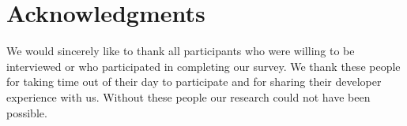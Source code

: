 \documentclass[conference]{IEEEtran}
\begin{document}
\section{Acknowledgments}

We would sincerely like to thank all participants who were willing to be interviewed or who participated
in completing our survey. We thank these people for taking time out of their day to participate and for
sharing their developer experience with us. Without these people our research could not have been possible.


\balance


\end{document}
